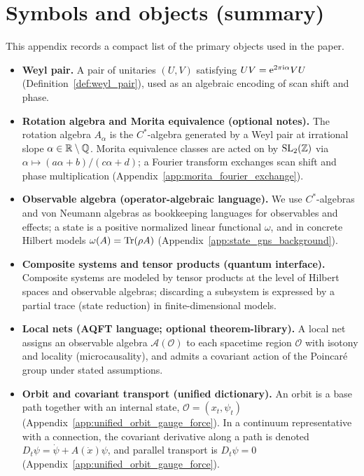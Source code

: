\section{Symbols and objects (summary)}
\label{app:symbols}

This appendix records a compact list of the primary objects used in the paper.

\begin{itemize}
\item \textbf{Weyl pair.}
A pair of unitaries $(U,V)$ satisfying $UV=\mathrm{e}^{2\pi\mathrm{i}\alpha}VU$ (Definition~\ref{def:weyl_pair}), used as an algebraic encoding of scan shift and phase.
\item \textbf{Rotation algebra and Morita equivalence (optional notes).}
The rotation algebra $A_\alpha$ is the $C^\ast$-algebra generated by a Weyl pair at irrational slope $\alpha\in\mathbb{R}\setminus\mathbb{Q}$.
Morita equivalence classes are acted on by $\mathrm{SL}_2(\mathbb{Z})$ via $\alpha\mapsto (a\alpha+b)/(c\alpha+d)$; a Fourier transform exchanges scan shift and phase multiplication (Appendix~\ref{app:morita_fourier_exchange}).
\item \textbf{Observable algebra (operator-algebraic language).}
We use $C^\ast$-algebras and von Neumann algebras as bookkeeping languages for observables and effects; a state is a positive normalized linear functional $\omega$, and in concrete Hilbert models $\omega(A)=\mathrm{Tr}(\rho A)$ (Appendix~\ref{app:state_gns_background}).
\item \textbf{Composite systems and tensor products (quantum interface).}
Composite systems are modeled by tensor products at the level of Hilbert spaces and observable algebras; discarding a subsystem is expressed by a partial trace (state reduction) in finite-dimensional models.
\item \textbf{Local nets (AQFT language; optional theorem-library).}
A local net assigns an observable algebra $\mathcal{A}(\mathcal{O})$ to each spacetime region $\mathcal{O}$ with isotony and locality (microcausality), and admits a covariant action of the Poincar\'e group under stated assumptions.
\item \textbf{Orbit and covariant transport (unified dictionary).}
An orbit is a base path together with an internal state, $\mathcal{O}=(x_t,\psi_t)$ (Appendix~\ref{app:unified_orbit_gauge_force}).
In a continuum representative with a connection, the covariant derivative along a path is denoted $D_t\psi=\dot\psi + A(\dot x)\psi$, and parallel transport is $D_t\psi=0$ (Appendix~\ref{app:unified_orbit_gauge_force}).

\end{itemize}
